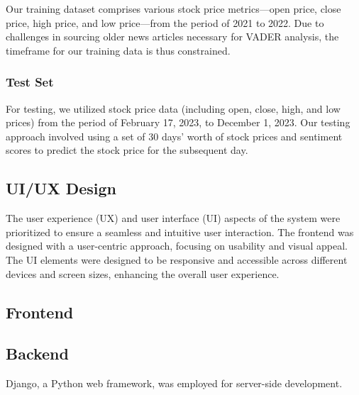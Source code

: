 Our training dataset comprises various stock price metrics—open price, close price, high price, and low price—from the period of 2021 to 2022. 
Due to challenges in sourcing older news articles necessary for VADER analysis, the timeframe for our training data is thus constrained.

\subsubsection{Test Set}

For testing, we utilized stock price data (including open, close, high, and low prices) from the period of February 17, 2023, to December 1, 2023. 
Our testing approach involved using a set of 30 days' worth of stock prices and sentiment scores to predict the stock price for the subsequent day.

\subsection{UI/UX Design}
The user experience (UX) and user interface (UI) aspects of the system were prioritized to ensure a seamless and intuitive user interaction. 
The frontend was designed with a user-centric approach, focusing on usability and visual appeal.
The UI elements were designed to be responsive and accessible across different devices and screen sizes, enhancing the overall user experience.



\subsection{Frontend}

\subsection{Backend}
Django, a Python web framework, was employed for server-side development.
